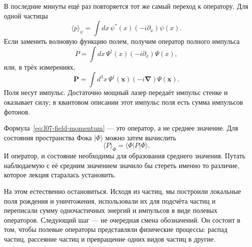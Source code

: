 В последние минуты ещё раз повторяется тот же самый переход к оператору. Для одной частицы
\begin{equation}
\langle p\rangle_\psi
=\int dx\,\psi^*(x)\left(-i\partial_x\right)\psi(x).
\label{eq:l07-one-particle-momentum}
\end{equation}
Если заменить волновую функцию полем, получим оператор полного импульса
\begin{equation}
P=\int dx\,\Psi^\dagger(x)\left(-i\partial_x\right)\Psi(x),
\label{eq:l07-field-momentum}
\end{equation}
или, в трёх измерениях,
\begin{equation}
\mathbf P=\int d^3x\,\Psi^\dagger(\mathbf x)
\left(-i\boldsymbol\nabla\right)\Psi(\mathbf x).
\end{equation}
Поля несут импульс. Достаточно мощный лазер передаёт импульс стенке и оказывает силу; в квантовом описании этот импульс поля есть сумма импульсов фотонов.

Формула~\eqref{eq:l07-field-momentum} — это оператор, а не среднее значение. Для состояния пространства Фока \(|\Phi\rangle\) можно затем вычислить
\begin{equation}
\langle P\rangle_\Phi=\langle\Phi|P|\Phi\rangle.
\end{equation}
И оператор, и состояние необходимы для образования среднего значения. Путать наблюдаемую с её средним значением значило бы стереть именно то различие, которое лекция старалась установить.

\begin{classroomqa}
\end{classroomqa}

На этом естественно остановиться. Исходя из частиц, мы построили локальные поля рождения и уничтожения, использовали их для подсчёта частиц и переписали сумму одночастичных энергий и импульсов в виде полевых операторов. Следующий шаг — не очередная смена обозначений. Он состоит в том, чтобы полевые операторы представляли физические процессы: распад частиц, рассеяние частиц и превращение одних видов частиц в другие.
